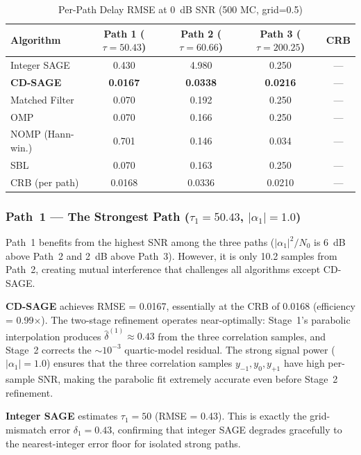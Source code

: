 \documentclass[journal]{IEEEtran}
\begin{document}
\begin{table}[t]
\centering
\caption{Per-Path Delay RMSE at 0~dB SNR (500 MC, grid=0.5)}
\label{tab:perpath}
\small
\begin{tabular}{@{}lcccc@{}}
\toprule
Algorithm & Path 1 ($\tau{=}50.43$) & Path 2 ($\tau{=}60.66$) & Path 3 ($\tau{=}200.25$) & CRB \\
\midrule
Integer SAGE & 0.430 & 4.980 & 0.250 & --- \\
\textbf{CD-SAGE} & \textbf{0.0167} & \textbf{0.0338} & \textbf{0.0216} & --- \\
Matched Filter & 0.070 & 0.192 & 0.250 & --- \\
OMP & 0.070 & 0.166 & 0.250 & --- \\
NOMP (Hann-win.) & 0.701 & 0.146 & 0.034 & --- \\
SBL & 0.070 & 0.163 & 0.250 & --- \\
\midrule
CRB (per path) & 0.0168 & 0.0336 & 0.0210 & --- \\
\bottomrule
\end{tabular}
\end{table}

\subsubsection{Path~1 --- The Strongest Path ($\tau_1 = 50.43$, $|\alpha_1| = 1.0$)}

Path~1 benefits from the highest SNR among the three paths ($|\alpha_1|^2 / N_0$ is 6~dB above Path~2 and 2~dB above Path~3). However, it is only 10.2 samples from Path~2, creating mutual interference that challenges all algorithms except CD-SAGE.

\textbf{CD-SAGE} achieves RMSE = 0.0167, essentially at the CRB of 0.0168 (efficiency = 0.99$\times$). The two-stage refinement operates near-optimally: Stage~1's parabolic interpolation produces $\hat{\delta}^{(1)} \approx 0.43$ from the three correlation samples, and Stage~2 corrects the $\sim 10^{-3}$ quartic-model residual. The strong signal power ($|\alpha_1|=1.0$) ensures that the three correlation samples $y_{-1}, y_0, y_{+1}$ have high per-sample SNR, making the parabolic fit extremely accurate even before Stage~2 refinement.

\textbf{Integer SAGE} estimates $\tau_1 = 50$ (RMSE = 0.43). This is exactly the grid-mismatch error $\delta_1 = 0.43$, confirming that integer SAGE degrades gracefully to the nearest-integer error floor for isolated strong paths.
\end{document}
